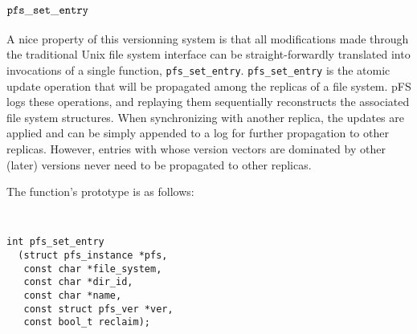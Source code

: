 

\subsection {${\tt pfs\_set\_entry}$}
\label{sec:pfssetentry}

A nice property of this versionning system is that all modifications
made through the traditional Unix file system interface can be
straight-forwardly translated into invocations of a single function,
{\tt pfs\_set\_entry}.  {\tt pfs\_set\_entry} is the atomic update
operation that will be propagated among the replicas of a file system.
pFS logs these operations, and replaying them sequentially
reconstructs the associated file system structures.  When
synchronizing with another replica, the updates are applied and can be
simply appended to a log for further propagation to other replicas.
However, entries with whose version vectors are dominated by other
(later) versions never need to be propagated to other replicas.

The function's prototype is as follows:

\begin{center}
{\tt \small
\begin{verbatim}
int pfs_set_entry 
  (struct pfs_instance *pfs,
   const char *file_system,
   const char *dir_id,
   const char *name,
   const struct pfs_ver *ver,
   const bool_t reclaim);
\end{verbatim}
}
\end{center}

